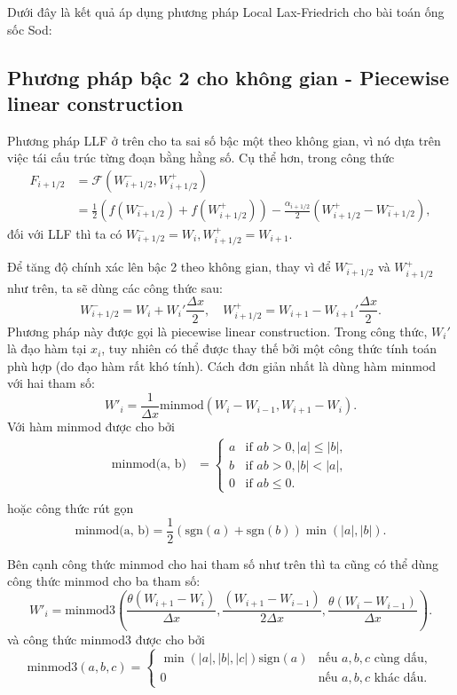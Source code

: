 Dưới đây là kết quả áp dụng phương pháp Local Lax-Friedrich cho bài toán ống sốc Sod:



\subsection{Phương pháp bậc 2 cho không gian - Piecewise linear construction}
Phương pháp LLF ở trên cho ta sai số bậc một theo không gian, vì nó dựa trên việc tái cấu trúc từng đoạn bằng hằng số. Cụ thể hơn, trong công thức
\begin{equation*}
\begin{aligned}
    F_{i+1/2} &= \mathcal{F}(W_{i+1/2}^-, W_{i+1/2}^+) \\
    &= \frac{1}{2} \left( f(W_{i+1/2}^-) + f(W_{i+1/2}^+) \right) - \frac{\alpha_{i+1/2}}{2} (W_{i+1/2}^+ - W_{i+1/2}^-),
\end{aligned}
\end{equation*}
đối với LLF thì ta có $W_{i+1/2}^- = W_i, W_{i+1/2}^+ = W_{i+1}$.

Để tăng độ chính xác lên bậc 2 theo không gian, thay vì để $W_{i+1/2}^-$ và $W_{i+1/2}^+$ như trên, ta sẽ dùng các công thức sau:
\[
W_{i+1/2}^- = W_i + W_i' \frac{\Delta x}{2}, \quad W_{i+1/2}^+ = W_{i+1} - W_{i+1}' \frac{\Delta x}{2}.
\]
Phương pháp này được gọi là piecewise linear construction.
Trong công thức, $W_i'$ là đạo hàm tại $x_i$, tuy nhiên có thể được thay thế bởi một công thức tính toán phù hợp (do đạo hàm rất khó tính). Cách đơn giản nhất là dùng hàm minmod với hai tham số:
\[
W'_i = \frac{1}{\Delta x}\text{minmod}(W_i - W_{i-1}, W_{i+1} - W_i).
\]
Với hàm minmod được cho bởi
\begin{equation*}
    \begin{split}
    \text{minmod(a, b)} &= \begin{cases}
        a & \text{if } ab > 0, |a| \le |b|, \\
        b & \text{if } ab > 0, |b| < |a|, \\
        0 & \text{if } ab \le 0.
    \end{cases} \\
\end{split}
\end{equation*}
hoặc công thức rút gọn
\[
\text{minmod(a, b)} = \dfrac{1}{2}(\text{sgn}(a) + \text{sgn}(b)) \min(|a|, |b|).
\]

Bên cạnh công thức minmod cho hai tham số như trên thì ta cũng có thể dùng công thức minmod cho ba tham số:
\[
W'_i = \text{minmod3}\left(\frac{\theta(W_{i+1} - W_i)}{\Delta x}, \frac{(W_{i+1} - W_{i-1})}{2\Delta x}, \frac{\theta(W_i - W_{i-1})}{\Delta x}\right).
\]
và công thức minmod3 được cho bởi
\begin{equation*}
    \text{minmod3}(a, b, c) = \begin{cases}
        \min(|a|, |b|, |c|)\text{sign}(a) & \text{nếu } a, b, c \text{ cùng dấu}, \\
        0 & \text{nếu } a, b, c \text{ khác dấu}.
    \end{cases}
\end{equation*}

